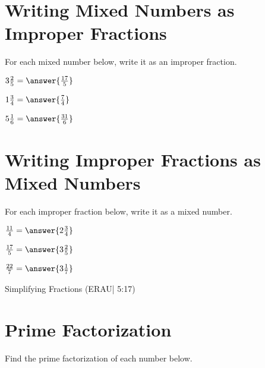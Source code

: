 \documentclass{ximera}
\begin{document}
\section*{Writing Mixed Numbers as Improper Fractions}

For each mixed number below, write it as an improper fraction.

\begin{problem}
$3\frac{2}{5} = \answer{\frac{17}{5}}$
\end{problem}

\begin{problem}
$1\frac{3}{4} = \answer{\frac{7}{4}}$
\end{problem}

\begin{problem}
$5\frac{1}{6} = \answer{\frac{31}{6}}$
\end{problem}



\section*{Writing Improper Fractions as Mixed Numbers}

For each improper fraction below, write it as a mixed number.

\begin{problem}
$\frac{11}{4} = \answer{2\frac{3}{4}}$
\end{problem}

\begin{problem}
$\frac{17}{5} = \answer{3\frac{2}{5}}$
\end{problem}

\begin{problem}
$\frac{22}{7} = \answer{3\frac{1}{7}}$
\end{problem}


Simplifying Fractions (ERAU| 5:17)



\section*{Prime Factorization}

Find the prime factorization of each number below.
\end{document}
